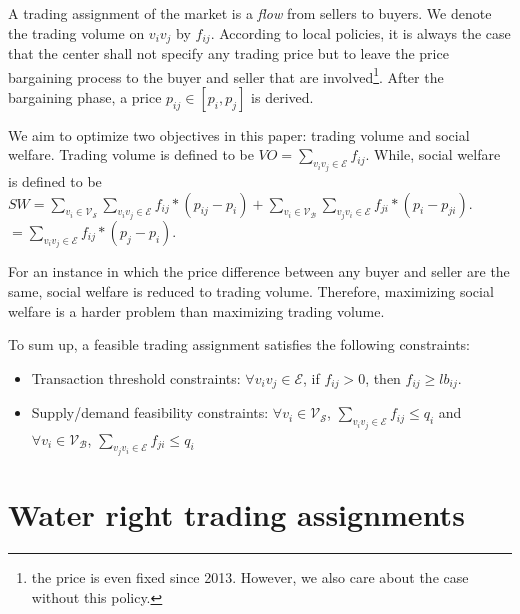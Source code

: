 \documentclass{aamas2015}
\begin{document}
A trading assignment of the market is a {\em flow} from sellers to buyers. We denote the trading volume on $v_iv_j$ by $f_{ij}$. According to local policies, it is always the case that the center shall not specify any trading price but to leave the price bargaining process to the buyer and seller that are involved\footnote{the price is even fixed since 2013. However, we also care about the case without this policy.}. After the bargaining phase, a price $p_{ij}\in [p_i, p_j]$ is derived.


We aim to optimize two objectives in this paper: trading volume and social welfare.
Trading volume is defined to be $VO=\sum_{v_iv_j\in \mathcal{E}}f_{ij}$.
While, social welfare is defined to be
$SW=\sum_{v_i\in \mathcal{V_S}}\sum_{v_iv_j\in \mathcal{E}} f_{ij}*(p_{ij}-p_i)+\sum_{v_i\in \mathcal{V_B}}\sum_{v_jv_i\in \mathcal{E}} f_{ji}*(p_i-p_{ji})$.
$=\sum_{v_iv_j\in \mathcal{E}}f_{ij}*(p_j-p_i)$.

For an instance in which the price difference between any buyer and seller are the same, social welfare is reduced to trading volume. Therefore, maximizing social welfare is a harder problem than maximizing trading volume.



To sum up, a feasible trading assignment satisfies the following constraints:
\begin{itemize}
	\item  Transaction threshold constraints: $\forall v_iv_j\in \mathcal{E}$, if $f_{ij}>0$, then $f_{ij}\geq lb_{ij}$.
	\item  Supply/demand feasibility constraints:
	$\forall v_i\in \mathcal{V_S}$, $\sum_{v_iv_j\in \mathcal{E}}f_{ij}\leq q_i$ and
	$\forall  v_i\in \mathcal{V_B}$, $\sum_{v_jv_i\in \mathcal{E}}f_{ji}\leq q_i$
\end{itemize}



\section{Water right trading assignments}
\end{document}
